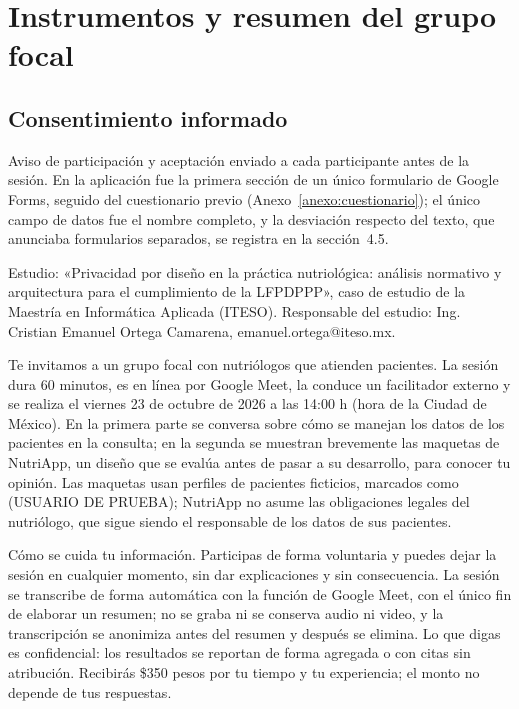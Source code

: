 \documentclass[12pt, a4paper]{article}
\makeatletter
\newcommand{\saltoseccion}{\par
  \ifx\@deferlist\@empty
    \ifdim\pagegoal<\maxdimen
      \ifdim\dimexpr\textheight-\pagegoal+\pagetotal\relax>0.5\textheight\clearpage\fi
    \fi
  \else\clearpage\fi}
\let\seccionbase\section
\renewcommand{\section}{\saltoseccion\seccionbase}
\makeatother
\begin{document}
\section{Instrumentos y resumen del grupo focal}
\label{anexo:grupo-focal}

\subsection{Consentimiento informado}
\label{anexo:consentimiento}
 
Aviso de participación y aceptación enviado a cada participante antes de la sesión. En la aplicación fue la primera sección de un único formulario de Google Forms, seguido del cuestionario previo (Anexo~\ref{anexo:cuestionario}); el único campo de datos fue el nombre completo, y la desviación respecto del texto, que anunciaba formularios separados, se registra en la sección~4.5.
 
Estudio: «Privacidad por diseño en la práctica nutriológica: análisis normativo y arquitectura para el cumplimiento de la LFPDPPP», caso de estudio de la Maestría en Informática Aplicada (ITESO). Responsable del estudio: Ing. Cristian Emanuel Ortega Camarena, emanuel.ortega@iteso.mx.
 
Te invitamos a un grupo focal con nutriólogos que atienden pacientes. La sesión dura 60 minutos, es en línea por Google Meet, la conduce un facilitador externo y se realiza el viernes 23 de octubre de 2026 a las 14:00 h (hora de la Ciudad de México). En la primera parte se conversa sobre cómo se manejan los datos de los pacientes en la consulta; en la segunda se muestran brevemente las maquetas de NutriApp, un diseño que se evalúa antes de pasar a su desarrollo, para conocer tu opinión. Las maquetas usan perfiles de pacientes ficticios, marcados como (USUARIO DE PRUEBA); NutriApp no asume las obligaciones legales del nutriólogo, que sigue siendo el responsable de los datos de sus pacientes.
 
Cómo se cuida tu información. Participas de forma voluntaria y puedes dejar la sesión en cualquier momento, sin dar explicaciones y sin consecuencia. La sesión se transcribe de forma automática con la función de Google Meet, con el único fin de elaborar un resumen; no se graba ni se conserva audio ni video, y la transcripción se anonimiza antes del resumen y después se elimina. Lo que digas es confidencial: los resultados se reportan de forma agregada o con citas sin atribución. Recibirás \$350 pesos por tu tiempo y tu experiencia; el monto no depende de tus respuestas.
 
\end{document}
